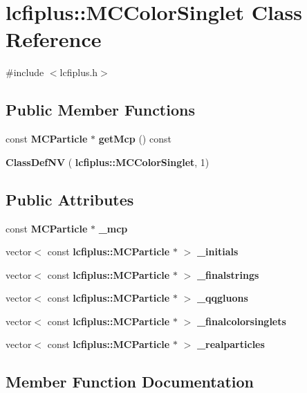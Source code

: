 \section{lcfiplus\+:\+:M\+C\+Color\+Singlet Class Reference}
\label{classlcfiplus_1_1MCColorSinglet}


{\ttfamily \#include $<$lcfiplus.\+h$>$}

\subsection*{Public Member Functions}
\begin{DoxyCompactItemize}
\item 
const \textbf{ M\+C\+Particle} $\ast$ \textbf{ get\+Mcp} () const
\item 
\textbf{ Class\+Def\+NV} (\textbf{ lcfiplus\+::\+M\+C\+Color\+Singlet}, 1)
\end{DoxyCompactItemize}
\subsection*{Public Attributes}
\begin{DoxyCompactItemize}
\item 
const \textbf{ M\+C\+Particle} $\ast$ \textbf{ \+\_\+mcp}
\item 
vector$<$ const \textbf{ lcfiplus\+::\+M\+C\+Particle} $\ast$ $>$ \textbf{ \+\_\+initials}
\item 
vector$<$ const \textbf{ lcfiplus\+::\+M\+C\+Particle} $\ast$ $>$ \textbf{ \+\_\+finalstrings}
\item 
vector$<$ const \textbf{ lcfiplus\+::\+M\+C\+Particle} $\ast$ $>$ \textbf{ \+\_\+qqgluons}
\item 
vector$<$ const \textbf{ lcfiplus\+::\+M\+C\+Particle} $\ast$ $>$ \textbf{ \+\_\+finalcolorsinglets}
\item 
vector$<$ const \textbf{ lcfiplus\+::\+M\+C\+Particle} $\ast$ $>$ \textbf{ \+\_\+realparticles}
\end{DoxyCompactItemize}


\subsection{Member Function Documentation}
\mbox{\label{classlcfiplus_1_1MCColorSinglet_a8b4677e31783e48ffeba38812388898d}} 
